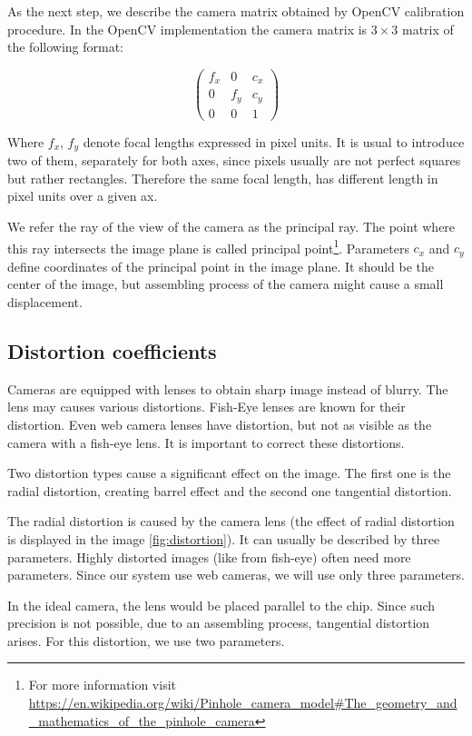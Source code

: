 As the next step, we describe the camera matrix obtained by OpenCV calibration
procedure. In the OpenCV implementation the camera matrix is $3\times3$ matrix of the
following format:

\[
\begin{pmatrix}
	f_x 	& 0 	& c_x \\
	0	& f_y	& c_y \\
	0	& 0	& 1
\end{pmatrix}
\]

Where $f_x$, $f_y$ denote focal lengths expressed in pixel units. It is usual
to introduce two of them, separately for both axes, since pixels usually are
not perfect squares but rather rectangles. Therefore the same focal length, has
different length in pixel units over a given ax.

We refer the ray of the view of the camera as the principal ray. The point
where this ray intersects the image plane is called principal
point\footnote{For more information visit \url{https://en.wikipedia.org/wiki/Pinhole\_camera\_model\#The\_geometry\_and\_mathematics\_of\_the\_pinhole\_camera}}.
Parameters $c_x$ and $c_y$ define coordinates of the principal point in the
image plane.  It should be the center of the image, but assembling process of
the camera might cause a small displacement.

\subsection{Distortion coefficients}

Cameras are equipped with lenses to obtain sharp image instead of blurry. The
lens may causes various distortions. Fish-Eye lenses are known for their
distortion.  Even web camera lenses have distortion, but not as visible as the
camera with a fish-eye lens. It is important to correct these distortions.

Two distortion types cause a significant effect on the image. The first one is
the radial distortion, creating barrel effect and the second one tangential distortion.

The radial distortion is caused by the camera lens (the effect of radial
distortion is displayed in the image \ref{fig:distortion}). It can usually be
described by three parameters. Highly distorted images (like from fish-eye)
often need more parameters. Since our system use web cameras, we will use only
three parameters.

In the ideal camera, the lens would be placed parallel to the chip. Since such
precision is not possible, due to an assembling process, tangential distortion
arises. For this distortion, we use two parameters.

